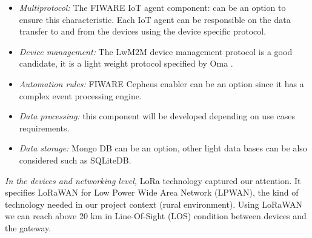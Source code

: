 \begin{itemize}
    \item \emph{Multiprotocol:}
The FIWARE IoT agent component: can be an option to ensure this characteristic. 
Each IoT agent can be responsible on the data transfer to and from the devices using the device specific protocol. 
    \item \emph{Device management:}
The LwM2M device management protocol is a good candidate, it is a light weight protocol specified by Oma .
    \item \emph{Automation rules:}
FIWARE Cepheus enabler can be an option since it has a complex event processing engine. 
    \item \emph{Data processing:}
this component will be developed depending on use cases requirements.
    \item \emph{Data storage:}
Mongo DB can be an option, other light data bases can be also considered such as SQLiteDB.
\end{itemize}

\emph{In the devices and networking level,} LoRa technology captured our attention. 
It specifies LoRaWAN for Low Power Wide Area Network (LPWAN), the kind of technology needed in our project context (rural environment). 
Using LoRaWAN we can reach above 20 km in Line-Of-Sight (LOS) condition between devices and the gateway. 

